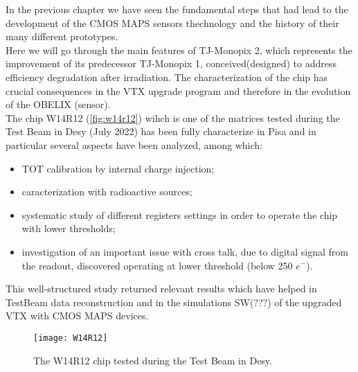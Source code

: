 In the previous chapter we have seen the fundamental steps that had lead to the development of the CMOS MAPS sensors thechnology and the history of their many different prototypes. \\
Here we will go through the main features of TJ-Monopix 2, which represents the improvement of its predecessor TJ-Monopix 1, conceived(designed) to address efficiency degradation after irradiation. The characterization of the chip has crucial consequences in the VTX upgrade program and therefore in the evolution of the OBELIX (sensor).\\
The chip W14R12 (\vref{fig:w14r12}) wihch is one of the matrices tested during the Test Beam in Desy (July 2022) has been fully characterize in Pisa and in particular several aspects have been analyzed, among which:

\begin{itemize}
\item TOT calibration by internal charge injection;
\item caracterization with radioactive sources;
\item systematic study of different registers settings in order to operate the chip with lower thresholds;
\item investigation of an important issue with cross talk, due to digital signal from the readout, discovered operating at lower threshold (below 250 $e^{-}$).
\end{itemize}

This well-structured study returned relevant results which have helped in TestBeam data reconstruction and in the simulations SW(???) of the upgraded VTX with CMOS MAPS devices.




\begin{figure}[h!]
\centering
\texttt{[image: W14R12]}
\caption{The W14R12 chip tested during the Test Beam in Desy.}
\label{fig:w14r12}
\end{figure}




